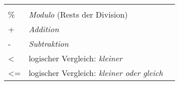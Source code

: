 \begin{longtable}[c]{@{}lll@{}}
\begin{minipage}[t]{0.15\columnwidth}
\end{minipage}
\\\noalign{\medskip}
\begin{minipage}[t]{0.08\columnwidth}\raggedright
\%
\end{minipage} & \begin{minipage}[t]{0.77\columnwidth}\raggedright
\emph{Modulo} (Rests der Division)
\end{minipage} & \begin{minipage}[t]{0.15\columnwidth}\raggedright
\end{minipage}
\\\noalign{\medskip}
\begin{minipage}[t]{0.08\columnwidth}\raggedright
+
\end{minipage} & \begin{minipage}[t]{0.77\columnwidth}\raggedright
\emph{Addition}
\end{minipage} & \begin{minipage}[t]{0.15\columnwidth}\raggedright
\end{minipage}
\\\noalign{\medskip}
\begin{minipage}[t]{0.08\columnwidth}\raggedright
-
\end{minipage} & \begin{minipage}[t]{0.77\columnwidth}\raggedright
\emph{Subtraktion}
\end{minipage} & \begin{minipage}[t]{0.15\columnwidth}\raggedright
\end{minipage}
\\\noalign{\medskip}
\begin{minipage}[t]{0.08\columnwidth}\raggedright
\textless{}
\end{minipage} & \begin{minipage}[t]{0.77\columnwidth}\raggedright
logischer Vergleich: \emph{kleiner}
\end{minipage} & \begin{minipage}[t]{0.15\columnwidth}\raggedright
\end{minipage}
\\\noalign{\medskip}
\begin{minipage}[t]{0.08\columnwidth}\raggedright
\textless{}=
\end{minipage} & \begin{minipage}[t]{0.77\columnwidth}\raggedright
logischer Vergleich: \emph{kleiner oder gleich}
\end{minipage} & \begin{minipage}[t]{0.15\columnwidth}\raggedright

\end{minipage}
\end{longtable}
